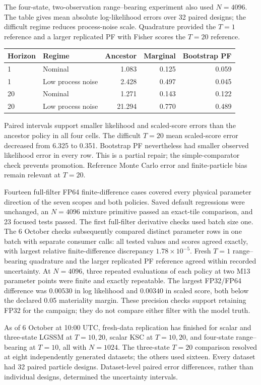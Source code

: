 The four-state, two-observation range--bearing experiment also used $N=4096$.
The table gives mean absolute log-likelihood errors over 32 paired designs;
the difficult regime reduces process-noise scale. Quadrature provided the
$T=1$ reference and a larger replicated PF with Fisher scores the $T=20$
reference.
\begin{center}
\begin{tabular}{llrrr}
\toprule
Horizon & Regime & Ancestor & Marginal & Bootstrap PF\\
\midrule
1 & Nominal & 1.083 & 0.125 & 0.059\\
1 & Low process noise & 2.428 & 0.497 & 0.045\\
20 & Nominal & 1.271 & 0.143 & 0.122\\
20 & Low process noise & 21.294 & 0.770 & 0.489\\
\bottomrule
\end{tabular}
\end{center}
Paired intervals support smaller likelihood and scaled-score errors than the
ancestor policy in all four cells. The difficult $T=20$ mean scaled-score error
decreased from 6.325 to 0.351. Bootstrap PF nevertheless had smaller observed
likelihood error in every row. This is a partial repair; the simple-comparator
check prevents promotion. Reference Monte Carlo error and finite-particle
bias remain relevant at $T=20$.

Fourteen full-filter FP64 finite-difference cases covered every physical
parameter direction of the seven scopes and both policies. Saved default
regressions were unchanged, an $N=4096$ mixture primitive passed an exact-tile
comparison, and 23 focused tests passed. The first full-filter derivative checks
used batch size one. The 6 October checks subsequently compared distinct
parameter rows in one batch with separate consumer calls: all tested values
and scores agreed exactly, with largest relative finite-difference discrepancy
$1.78\times10^{-5}$. Fresh $T=1$ range--bearing quadrature and the larger
replicated PF reference agreed within recorded uncertainty. At $N=4096$,
three repeated evaluations of each policy at two M13 parameter points were
finite and exactly repeatable. The largest FP32/FP64 difference was $0.00530$
in log likelihood and $0.00340$ in scaled score, both below the declared 0.05
materiality margin. These precision checks support retaining FP32 for the
campaign; they do not compare either filter with the model truth.

As of 6 October at 10:00 UTC, fresh-data replication has finished for
scalar and three-state LGSSM at $T=10,20$, scalar KSC at $T=10,20$, and
four-state range--bearing at $T=10$, all with $N=1024$. The three-state
$T=20$ comparison resolved at eight independently generated datasets;
the others used sixteen. Every dataset had 32 paired particle designs. Dataset-level paired error differences, rather than individual
designs, determined the uncertainty intervals.

